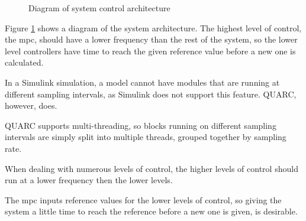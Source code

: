 \begin{figure}
\centering
{}
\caption{Diagram of system control architecture} \label{fig:system_arch}
\end{figure}

Figure \ref{fig:system_arch} shows a diagram of the system architecture. The highest level of control, the \acrshort{mpc}, should have a lower frequency than the rest of the system, so the lower level controllers have time to reach the given reference value before a new one is calculated.

In a Simulink simulation, a model cannot have modules that are running at different sampling intervals, as Simulink does not support this feature. QUARC, however, does. 

QUARC supports multi-threading, so blocks running on different sampling intervals are simply split into multiple threads, grouped together by sampling rate.  \cite{http://quanser-update.azurewebsites.net/quarc/documentation/quarc_multithreading.html}

When dealing with numerous levels of control, the higher levels of control should run at a lower frequency then the lower levels. 

The \acrshort{mpc} inputs reference values for the lower levels of control, so giving the system a little time to reach the reference before a new one is given, is desirable. 

